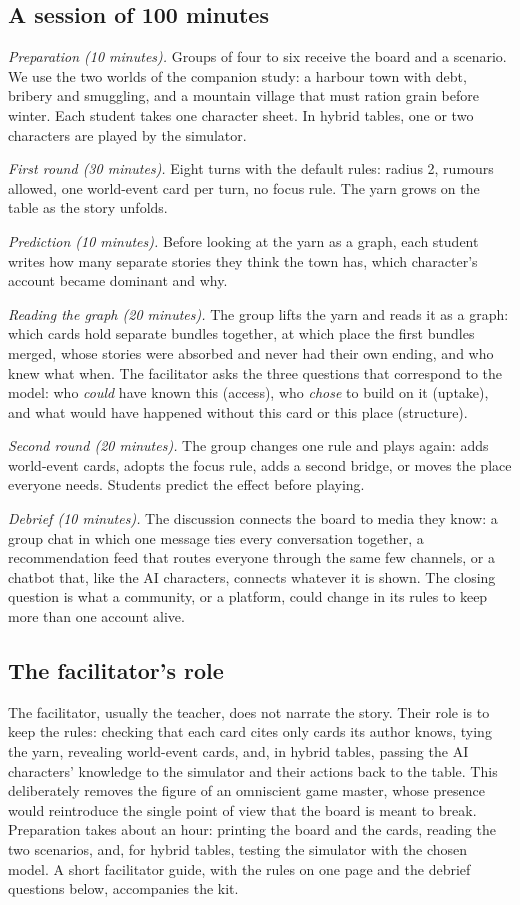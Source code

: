 \documentclass[12pt]{article}
\begin{document}
\subsection{A session of 100 minutes}

\emph{Preparation (10 minutes).} Groups of four to six receive the board and
a scenario. We use the two worlds of the companion study: a harbour town
with debt, bribery and smuggling, and a mountain village that must ration
grain before winter. Each student takes one character sheet. In hybrid
tables, one or two characters are played by the simulator.

\emph{First round (30 minutes).} Eight turns with the default rules: radius
2, rumours allowed, one world-event card per turn, no focus rule. The yarn
grows on the table as the story unfolds.

\emph{Prediction (10 minutes).} Before looking at the yarn as a graph, each
student writes how many separate stories they think the town has, which
character's account became dominant and why.

\emph{Reading the graph (20 minutes).} The group lifts the yarn and reads it
as a graph: which cards hold separate bundles together, at which place the
first bundles merged, whose stories were absorbed and never had their own
ending, and who knew what when. The facilitator asks the three questions
that correspond to the model: who \emph{could} have known this (access), who
\emph{chose} to build on it (uptake), and what would have happened without
this card or this place (structure).

\emph{Second round (20 minutes).} The group changes one rule and plays again:
adds world-event cards, adopts the focus rule, adds a second bridge, or
moves the place everyone needs. Students predict the effect before playing.

\emph{Debrief (10 minutes).} The discussion connects the board to media they
know: a group chat in which one message ties every conversation together, a
recommendation feed that routes everyone through the same few channels, or a
chatbot that, like the AI characters, connects whatever it is shown. The
closing question is what a community, or a platform, could change in its
rules to keep more than one account alive.

\subsection{The facilitator's role}

The facilitator, usually the teacher, does not narrate the story. Their role
is to keep the rules: checking that each card cites only cards its author
knows, tying the yarn, revealing world-event cards, and, in hybrid tables,
passing the AI characters' knowledge to the simulator and their actions back
to the table. This deliberately removes the figure of an omniscient game
master, whose presence would reintroduce the single point of view that the
board is meant to break. Preparation takes about an hour: printing the board
and the cards, reading the two scenarios, and, for hybrid tables, testing
the simulator with the chosen model. A short facilitator guide, with the
rules on one page and the debrief questions below, accompanies the kit.
\end{document}
